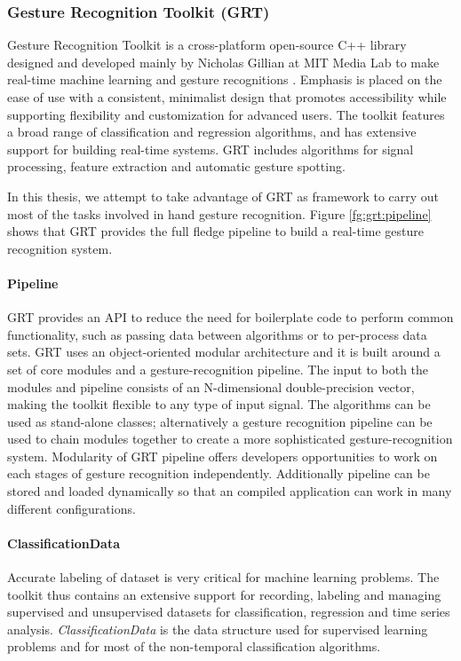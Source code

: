 \subsubsection{Gesture Recognition Toolkit (GRT)} \label{sec:grt} Gesture Recognition Toolkit is a cross-platform open-source C++ library designed and developed mainly by Nicholas Gillian at MIT Media Lab to make real-time machine learning and gesture recognitions \cite{16}. Emphasis is placed on the ease of use with a consistent, minimalist design that promotes accessibility while supporting flexibility and customization for advanced users. The toolkit features a broad range of classification and regression algorithms, and has extensive support for building real-time systems. GRT includes algorithms for signal processing, feature extraction and automatic gesture spotting. 

In this thesis, we attempt to take advantage of GRT as framework to carry out most of the tasks involved in hand gesture recognition. Figure \ref{fg:grt:pipeline} shows that GRT provides the full fledge pipeline to build a real-time gesture recognition system. 



\paragraph*{Pipeline} GRT provides an API to reduce the need for boilerplate code to perform common functionality, such as passing data between algorithms or to per-process data sets. GRT uses an object-oriented modular architecture and it is built around a set of core modules and a gesture-recognition pipeline. The input to both the modules and pipeline consists of an N-dimensional double-precision vector, making the toolkit flexible to any type of input signal. The algorithms can be used as stand-alone classes; alternatively a gesture recognition pipeline can be used to chain modules together to create a more sophisticated gesture-recognition system. Modularity of GRT pipeline offers developers opportunities to work on each stages of gesture recognition independently. Additionally pipeline can be stored and loaded dynamically so that an compiled application can work in many different configurations. 

\paragraph*{ClassificationData} Accurate labeling of dataset is very critical for machine learning problems. The toolkit thus contains an extensive support for recording, labeling and managing supervised and unsupervised datasets for classification, regression and time series analysis. \textit{ClassificationData} is the data structure used for supervised learning problems and for most of the non-temporal classification algorithms.

